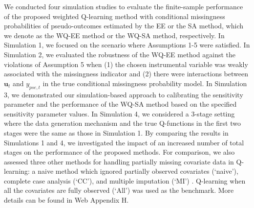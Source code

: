 \documentclass[12pt]{article}
\begin{document}
We conducted four simulation studies to evaluate the finite-sample performance of the proposed weighted Q-learning method with conditional missingness probabilities of pseudo-outcomes estimated by  the EE or the SA method, which we denote as the WQ-EE method or the WQ-SA method, respectively. 
In Simulation 1, we focused on the scenario where Assumptions 1-5 were satisfied. In Simulation 2, we evaluated the robustness of the WQ-EE method against the violations of Assumption 5 when (1) the chosen instrumental variable was weakly associated with the missingness indicator and (2)  there were interactions between $\bm{u}_t$  and $y_{pse,t}$ in the true conditional missingness probability model. 
In Simulation 3, we demonstrated our simulation-based approach to calibrating the  sensitivity parameter and the performance of the WQ-SA method based on the specified sensitivity parameter values. In Simulation 4, we considered a 3-stage setting where the data generation mechanism  and  the true Q-functions in the first two stages were the same as those in Simulation 1. By comparing the results in Simulations 1 and 4, we investigated the impact of an increased number of total stages on the performance of the proposed methods.
For comparison, we also assessed three other methods for handling partially missing covariate data in Q-learning: a naive method which ignored partially observed covariates (`naive'), complete case analysis (`CC'), and multiple imputation (`MI') \citep{Little_Rubin_2014}. Q-learning when all the covariates are fully observed (`All') was used as the benchmark. More details %
can be found in Web Appendix H.
\end{document}

